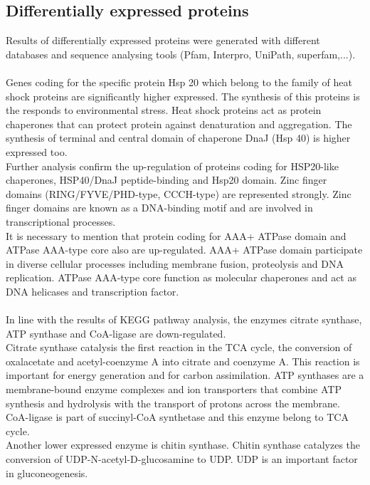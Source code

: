 \documentclass[12pt, a4paper]{report}
\begin{document}
\subsection{Differentially expressed proteins}
Results of differentially expressed proteins were generated with different databases and sequence analysing tools (Pfam, Interpro, UniPath, superfam,...).\\
\ \\
Genes coding for the specific protein Hsp 20 which belong to the family of heat shock proteins are significantly higher expressed. The synthesis of this proteins is the responds to environmental stress. Heat shock proteins act as protein chaperones that can protect protein against denaturation and aggregation. \cite{Lindquist1988} \cite{Maaroufi2013} The synthesis of terminal and central domain of chaperone DnaJ (Hsp 40) is higher expressed too. \\
Further analysis confirm the up-regulation of proteins coding for HSP20-like chaperones, HSP40/DnaJ peptide-binding and Hsp20 domain. Zinc finger domains (RING/FYVE/PHD-type, CCCH-type) are represented strongly. Zinc finger domains are known as a DNA-binding motif and are involved in transcriptional processes.\\
It is necessary to mention that protein coding for AAA+ ATPase domain and ATPase  AAA-type core also are up-regulated. AAA+ ATPase domain participate in diverse cellular processes including membrane fusion, proteolysis and DNA replication. ATPase  AAA-type core function as molecular chaperones and act as DNA helicases and transcription factor.\\
\ \\
In line with the results of KEGG pathway analysis, the enzymes citrate synthase, ATP synthase and CoA-ligase are down-regulated. \\
Citrate synthase catalysis the first reaction in the TCA cycle, the conversion of oxalacetate and acetyl-coenzyme A into citrate and coenzyme A. This reaction is important for energy generation and for carbon assimilation. ATP synthases are a membrane-bound enzyme complexes and ion transporters that combine ATP synthesis and hydrolysis with the transport of protons across the membrane. CoA-ligase is part of succinyl-CoA synthetase and this enzyme belong to TCA cycle. \\
Another lower expressed enzyme is chitin synthase. Chitin synthase catalyzes the conversion of UDP-N-acetyl-D-glucosamine to UDP. UDP is an important factor in gluconeogenesis. \\
\end{document}
